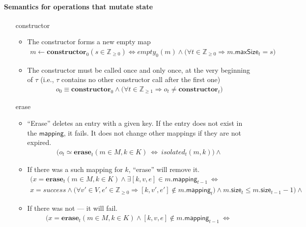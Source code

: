\documentclass{article}
\renewcommand{\o}[1]{\ensuremath{\mathbf{#1}}}
\newcommand{\p}[1]{\ensuremath{\mathit{#1}}}
\newcommand{\s}[1]{\ensuremath{\mathsf{#1}}}
\newcommand{\nintset}{\ensuremath{\mathds{Z}_{\ge 0}}}
\newcommand{\moreset}[1]{\ensuremath{\mathds{Z}_{\ge #1}}}
\begin{document}
\paragraph{Semantics for operations that mutate state}
\begin{itemize}
\item[constructor]
  \begin{itemize}
  \item The constructor forms a new empty map
    \begin{gather*}
      m \gets \o{constructor}_0(s \in \nintset) \Leftrightarrow \p{empty}_0(m) \wedge \big(\forall t \in \nintset \Rightarrow m.\s{maxSize}_t=s\big)
    \end{gather*}
  \item The constructor must be called once and only once, at the very beginning of $\tau$ (i.e., $\tau$ contains no other constructor call after the first one)
    \begin{gather*}
      o_0 \equiv \o{constructor}_0 \wedge \big(\forall t\in \moreset{1} \Rightarrow o_t \neq \o{constructor}_t\big)
    \end{gather*}
  \end{itemize}
\item[erase]
  \begin{itemize}
  \item ``Erase'' deletes an entry with a given key. If the entry does not exist in the \s{mapping}, it fails. It does not change other mappings if they are not expired.
    \begin{gather*}
      \Big(o_t \simeq \o{erase}_t(m\in M, k\in K) ~\Leftrightarrow~ \p{isolated}_t(m, k)\Big) \wedge
    \end{gather*}
  \item If there was a such mapping for $k$, ``erase'' will remove it.
    \begin{gather}
      \Big(x=\o{erase}_t(m\in M, k\in K) \wedge \exists [k, v, e] \in m.\s{mapping}_{t-1} ~\Leftrightarrow~\nonumber\\
      x=success \wedge \big(\forall v'\in V, e'\in \nintset \Rightarrow [k, v', e'] \not\in m.\s{mapping}_t\big) \wedge m.\s{size}_t \le m.\s{size}_{t-1}-1 \Big) \wedge
      \label{eq:erase1}
    \end{gather}
  \item If there was not --- it will fail.
    \begin{gather}
      \Big( x=\o{erase}_t(m\in M, k\in K) \wedge [k,v,e]\not\in m.\s{mapping}_{t-1} ~\Leftrightarrow~ \nonumber\\

\end{gather}
\end{itemize}
\end{itemize}
\end{document}
